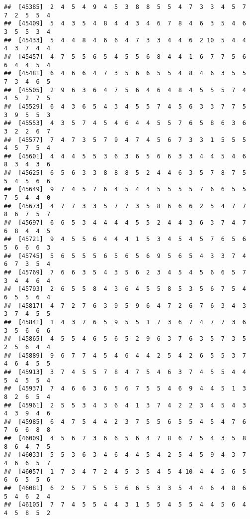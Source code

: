 \documentclass[
]{book}
\begin{document}
\begin{verbatim}
##  [45385]  2  4  5  4  9  4  5  3  8  8  5  5  4  7  3  3  4  5  7  7  2  5  5  4
##  [45409]  5  4  3  5  4  8  4  4  3  4  6  7  8  4  6  3  5  4  6  3  5  5  3  4
##  [45433]  5  4  4  8  4  6  6  4  7  3  3  4  4  6  2 10  5  4  4  4  3  7  4  4
##  [45457]  4  7  5  5  6  5  4  5  5  6  8  4  4  1  6  7  7  5  6  6  4  4  5  4
##  [45481]  6  4  6  6  4  7  3  5  6  6  5  5  4  8  4  6  3  5  5  7  3  4  6  5
##  [45505]  2  9  6  3  6  4  7  5  6  4  6  4  8  4  5  5  5  7  4  4  5  2  7  5
##  [45529]  6  4  3  6  5  4  3  4  5  5  7  4  5  6  3  3  7  7  5  3  9  5  5  3
##  [45553]  4  3  5  7  4  5  4  6  4  4  5  5  7  6  5  8  6  3  6  3  2  2  6  7
##  [45577]  7  4  7  3  5  7  9  4  7  4  5  6  7  3  3  1  5  5  5  4  5  7  5  4
##  [45601]  4  4  4  5  5  3  6  3  6  5  6  6  3  3  4  4  5  4  6  8  3  4  3  6
##  [45625]  6  5  6  3  3  8  8  8  5  2  4  4  6  3  5  7  8  7  5  5  4  5  6  6
##  [45649]  9  7  4  5  7  6  4  5  4  4  5  5  5  5  7  6  6  5  5  7  5  4  4  0
##  [45673]  4  7  7  3  3  5  7  7  3  5  8  6  6  6  2  5  4  7  7  8  6  7  5  7
##  [45697]  6  6  5  3  4  4  4  4  5  5  2  4  4  3  6  3  7  4  7  6  8  4  4  5
##  [45721]  9  4  5  5  6  4  4  4  1  5  3  4  5  4  5  7  6  5  6  5  6  6  6  3
##  [45745]  5  6  5  5  5  6  5  6  5  6  9  5  6  5  4  3  3  7  4  6  7  3  5  4
##  [45769]  7  6  6  3  5  4  3  5  6  2  3  4  5  4  5  6  6  5  7  3  4  4  6  4
##  [45793]  2  6  5  5  8  4  3  6  4  5  5  8  5  3  5  6  7  5  4  6  5  5  6  4
##  [45817]  4  7  2  7  6  3  9  5  9  6  4  7  2  6  7  6  3  4  3  3  7  4  5  5
##  [45841]  1  4  3  7  6  5  9  5  5  1  7  3  6  7  4  7  7  3  6  3  5  6  6  6
##  [45865]  4  5  5  4  6  5  6  5  2  9  6  3  7  6  3  5  7  3  5  2  5  6  4  4
##  [45889]  9  6  7  7  4  5  4  6  4  4  2  5  4  2  6  5  5  3  7  4  6  4  5  5
##  [45913]  3  7  4  5  5  7  8  4  7  5  4  6  3  7  4  5  5  4  4  5  4  5  5  4
##  [45937]  7  4  6  6  3  6  5  6  7  5  5  4  6  9  4  4  5  1  3  8  2  6  5  4
##  [45961]  2  5  5  3  4  3  6  4  1  3  7  4  2  2  3  4  5  4  3  4  3  9  4  6
##  [45985]  6  4  7  5  4  4  2  3  7  5  5  6  5  5  4  5  4  7  6  7  6  6  8  8
##  [46009]  4  5  6  7  3  6  6  5  6  4  7  8  6  7  5  4  3  5  8  8  6  4  7  5
##  [46033]  5  5  3  6  3  4  6  4  4  5  4  2  5  4  5  9  4  3  7  4  6  6  5  7
##  [46057]  1  7  3  4  7  2  4  5  3  5  4  5  4 10  4  4  5  6  5  6  6  5  5  6
##  [46081]  6  2  5  7  5  5  5  6  6  5  3  3  5  4  4  6  4  8  6  5  4  6  2  4
##  [46105]  7  7  4  5  5  4  4  3  1  5  5  4  5  5  4  4  5  6  4  4  5  8  5  2

\end{verbatim}
\end{document}
